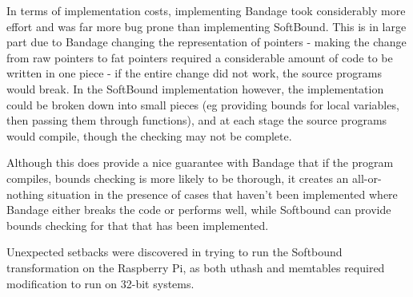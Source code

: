 \documentclass[a4paper,12pt,twoside,openright]{report}
\begin{document}
In terms of implementation costs, implementing Bandage took considerably more effort and was far more bug prone than implementing SoftBound.
This is in large part due to Bandage changing the representation of pointers - making the change from raw pointers to fat pointers required a considerable amount of code to be written in one piece - if the entire change did not work, the source programs would break.
In the SoftBound implementation however, the implementation could be broken down into small pieces (eg providing bounds for local variables, then passing them through functions), and at each stage the source programs would compile, though the checking may not be complete.

Although this does provide a nice guarantee with Bandage that if the program compiles, bounds checking is more likely to be thorough, it creates an all-or-nothing situation in the presence of cases that haven't been implemented where Bandage either breaks the code or performs well, while Softbound can provide bounds checking for that that has been implemented.

Unexpected setbacks were discovered in trying to run the Softbound transformation on the Raspberry Pi, as both uthash and memtables required modification to run on 32-bit systems.

\appendix
\singlespacing

 
 
\end{document}
